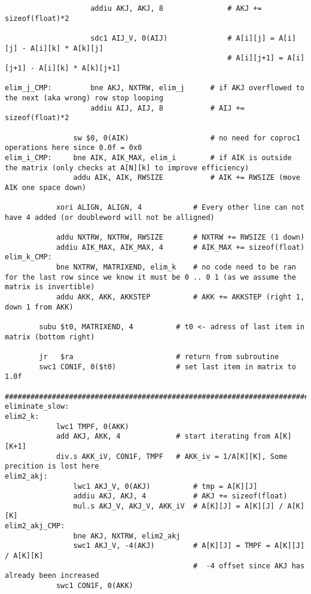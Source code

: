 \begin{verbatim}
                    addiu AKJ, AKJ, 8               # AKJ += sizeof(float)*2
                    
                    sdc1 AIJ_V, 0(AIJ)              # A[i][j] = A[i][j] - A[i][k] * A[k][j]
                                                    # A[i][j+1] = A[i][j+1] - A[i][k] * A[k][j+1]
        
elim_j_CMP:         bne AKJ, NXTRW, elim_j      # if AKJ overflowed to the next (aka wrong) row stop looping
                    addiu AIJ, AIJ, 8           # AIJ += sizeof(float)*2
                
                sw $0, 0(AIK)                   # no need for coproc1 operations here since 0.0f = 0x0
elim_i_CMP:     bne AIK, AIK_MAX, elim_i        # if AIK is outside the matrix (only checks at A[N][k] to improve efficiency)
                addu AIK, AIK, RWSIZE           # AIK += RWSIZE (move AIK one space down)
            
            xori ALIGN, ALIGN, 4            # Every other line can not have 4 added (or doubleword will not be alligned)
            
            addu NXTRW, NXTRW, RWSIZE       # NXTRW += RWSIZE (1 down)
            addiu AIK_MAX, AIK_MAX, 4       # AIK_MAX += sizeof(float)
elim_k_CMP: 
            bne NXTRW, MATRIXEND, elim_k    # no code need to be ran for the last row since we know it must be 0 .. 0 1 (as we assume the matrix is invertible)
            addu AKK, AKK, AKKSTEP          # AKK += AKKSTEP (right 1, down 1 from AKK)
            
        subu $t0, MATRIXEND, 4          # t0 <- adress of last item in matrix (bottom right)
        
        jr   $ra                        # return from subroutine
        swc1 CON1F, 0($t0)              # set last item in matrix to 1.0f

################################################################################
eliminate_slow:
elim2_k:            
            lwc1 TMPF, 0(AKK)
            add AKJ, AKK, 4             # start iterating from A[K][K+1]
            div.s AKK_iV, CON1F, TMPF   # AKK_iv = 1/A[K][K], Some precition is lost here
elim2_akj:
                lwc1 AKJ_V, 0(AKJ)          # tmp = A[K][J]
                addiu AKJ, AKJ, 4           # AKJ += sizeof(float)
                mul.s AKJ_V, AKJ_V, AKK_iV  # A[K][J] = A[K][J] / A[K][K]
elim2_akj_CMP:
                bne AKJ, NXTRW, elim2_akj
                swc1 AKJ_V, -4(AKJ)         # A[K][J] = TMPF = A[K][J] / A[K][K]
                                            #  -4 offset since AKJ has already been increased
            swc1 CON1F, 0(AKK)
            

\end{verbatim}
